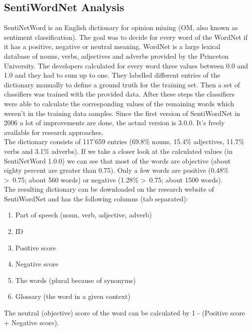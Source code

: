 \documentclass[a4paper]{article}
\begin{document}
\subsection{SentiWordNet Analysis}
SentiNetWord is an English dictionary for opinion mining (OM, also known as sentiment classification). The goal was to decide for every word of the WordNet if it has a positive, negative or neutral meaning. WordNet is a large lexical database of nouns, verbs, adjectives and adverbs provided by the Princeton University. The developers calculated for every word three values between 0.0 and 1.0 and they had to sum up to one. They labelled different entries of the dictionary manually to define a ground truth for the training set. Then a set of classifiers was trained with the provided data. After these steps the classifiers were able to calculate the corresponding values of the remaining words which weren't in the training data samples. Since the first version of SentiWordNet in 2006 a lot of improvements are done, the actual version is 3.0.0. It's freely available for research approaches.\\
The dictionary consists of 117'659 entries (69.8\% nouns, 15.4\% adjectives, 11.7\% verbs and 3.1\% adverbs). If we take a closer look at the calculated values (in SentiNetWord 1.0.0) we can see that most of the words are objective (about eighty percent are greater than 0.75). Only a few words are positive (0.48\% \textgreater \ 0.75; about 560 words) or negative (1.28\% \textgreater \ 0.75; about 1500 words).\\
The resulting dictionary can be downloaded on the research website of SentiWordNet and has the following columns (tab separated):
\begin{enumerate}
	\item Part of speech (noun, verb, adjective, adverb)
  \item ID
	\item Positive score
	\item Negative score
	\item The words (plural because of synonyms)
	\item Glossary (the word in a given context)
\end{enumerate}
The neutral (objective) score of the word can be calculated by 1 - (Positive score + Negative score).
\end{document}
